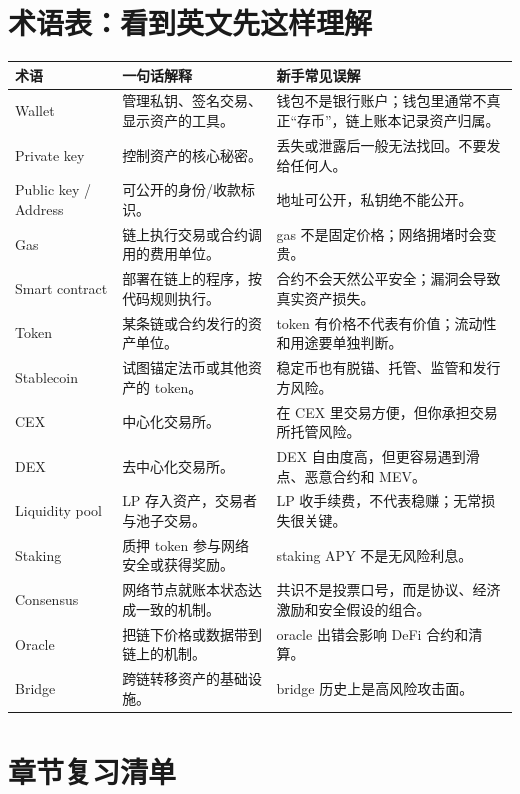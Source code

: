 \documentclass[UTF8,11pt]{ctexart}
\begin{document}
\section{术语表：看到英文先这样理解}

\begin{longtable}{>{\raggedright\arraybackslash}p{3.5cm}>{\raggedright\arraybackslash}p{5.3cm}>{\raggedright\arraybackslash}p{5.2cm}}
\toprule
\textbf{术语} & \textbf{一句话解释} & \textbf{新手常见误解} \\
\midrule
\endhead
Wallet & 管理私钥、签名交易、显示资产的工具。 & 钱包不是银行账户；钱包里通常不真正“存币”，链上账本记录资产归属。 \\
Private key & 控制资产的核心秘密。 & 丢失或泄露后一般无法找回。不要发给任何人。 \\
Public key / Address & 可公开的身份/收款标识。 & 地址可公开，私钥绝不能公开。 \\
Gas & 链上执行交易或合约调用的费用单位。 & gas 不是固定价格；网络拥堵时会变贵。 \\
Smart contract & 部署在链上的程序，按代码规则执行。 & 合约不会天然公平安全；漏洞会导致真实资产损失。 \\
Token & 某条链或合约发行的资产单位。 & token 有价格不代表有价值；流动性和用途要单独判断。 \\
Stablecoin & 试图锚定法币或其他资产的 token。 & 稳定币也有脱锚、托管、监管和发行方风险。 \\
CEX & 中心化交易所。 & 在 CEX 里交易方便，但你承担交易所托管风险。 \\
DEX & 去中心化交易所。 & DEX 自由度高，但更容易遇到滑点、恶意合约和 MEV。 \\
Liquidity pool & LP 存入资产，交易者与池子交易。 & LP 收手续费，不代表稳赚；无常损失很关键。 \\
Staking & 质押 token 参与网络安全或获得奖励。 & staking APY 不是无风险利息。 \\
Consensus & 网络节点就账本状态达成一致的机制。 & 共识不是投票口号，而是协议、经济激励和安全假设的组合。 \\
Oracle & 把链下价格或数据带到链上的机制。 & oracle 出错会影响 DeFi 合约和清算。 \\
Bridge & 跨链转移资产的基础设施。 & bridge 历史上是高风险攻击面。 \\
\bottomrule
\end{longtable}

\section{章节复习清单}
\end{document}

